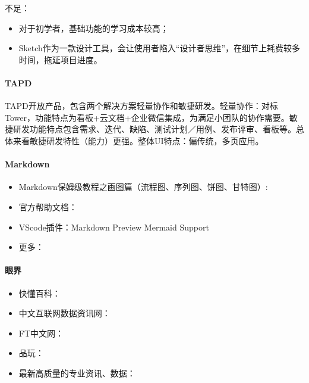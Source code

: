\documentclass[letterpaper,10pt,english]{sphinxmanual}
\begin{document}
不足：
\begin{itemize}
\item {} 
对于初学者，基础功能的学习成本较高；

\item {} 
Sketch作为一款设计工具，会让使用者陷入“设计者思维”，在细节上耗费较多时间，拖延项目进度。

\end{itemize}


\paragraph{TAPD}
\label{\detokenize{chapter_knowledge/tools:tapd}}
TAPD开放产品，包含两个解决方案\sphinxhyphen{}轻量协作和敏捷研发。轻量协作：对标Tower，功能特点为看板+云文档+企业微信集成，为满足小团队的协作需要。敏捷研发功能特点包含需求、迭代、缺陷、测试计划／用例、发布评审、看板等。总体来看敏捷研发特性（能力）更强。整体UI特点：偏传统，多页应用。



\paragraph{Markdown}
\label{\detokenize{chapter_knowledge/tools:markdown}}\begin{itemize}
\item {} 
Markdown保姆级教程之画图篇（流程图、序列图、饼图、甘特图）:

\item {} 
官方帮助文档：

\item {} 
VScode插件：Markdown Preview Mermaid Support

\item {} 
更多：

\end{itemize}


\paragraph{眼界}
\label{\detokenize{chapter_knowledge/tools:id3}}\begin{itemize}
\item {} 
快懂百科：

\item {} 
中文互联网数据资讯网：

\item {} 
FT中文网：

\item {} 
品玩：

\item {} 
最新高质量的专业资讯、数据：

\end{itemize}
\end{document}

